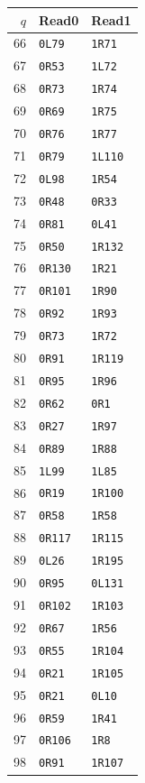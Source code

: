 \begin{center}
\begin{minipage}[t]{0.32\linewidth}\centering
\begin{tabular}{rll}\toprule
$q$&Read0&Read1\\\midrule
66&\texttt{0L79}&\texttt{1R71}\\
67&\texttt{0R53}&\texttt{1L72}\\
68&\texttt{0R73}&\texttt{1R74}\\
69&\texttt{0R69}&\texttt{1R75}\\
70&\texttt{0R76}&\texttt{1R77}\\
71&\texttt{0R79}&\texttt{1L110}\\
72&\texttt{0L98}&\texttt{1R54}\\
73&\texttt{0R48}&\texttt{0R33}\\
74&\texttt{0R81}&\texttt{0L41}\\
75&\texttt{0R50}&\texttt{1R132}\\
76&\texttt{0R130}&\texttt{1R21}\\
77&\texttt{0R101}&\texttt{1R90}\\
78&\texttt{0R92}&\texttt{1R93}\\
79&\texttt{0R73}&\texttt{1R72}\\
80&\texttt{0R91}&\texttt{1R119}\\
81&\texttt{0R95}&\texttt{1R96}\\
82&\texttt{0R62}&\texttt{0R1}\\
83&\texttt{0R27}&\texttt{1R97}\\
84&\texttt{0R89}&\texttt{1R88}\\
85&\texttt{1L99}&\texttt{1L85}\\
86&\texttt{0R19}&\texttt{1R100}\\
87&\texttt{0R58}&\texttt{1R58}\\
88&\texttt{0R117}&\texttt{1R115}\\
89&\texttt{0L26}&\texttt{1R195}\\
90&\texttt{0R95}&\texttt{0L131}\\
91&\texttt{0R102}&\texttt{1R103}\\
92&\texttt{0R67}&\texttt{1R56}\\
93&\texttt{0R55}&\texttt{1R104}\\
94&\texttt{0R21}&\texttt{1R105}\\
95&\texttt{0R21}&\texttt{0L10}\\
96&\texttt{0R59}&\texttt{1R41}\\
97&\texttt{0R106}&\texttt{1R8}\\
98&\texttt{0R91}&\texttt{1R107}\\

\end{tabular}
\end{minipage}
\end{center}
